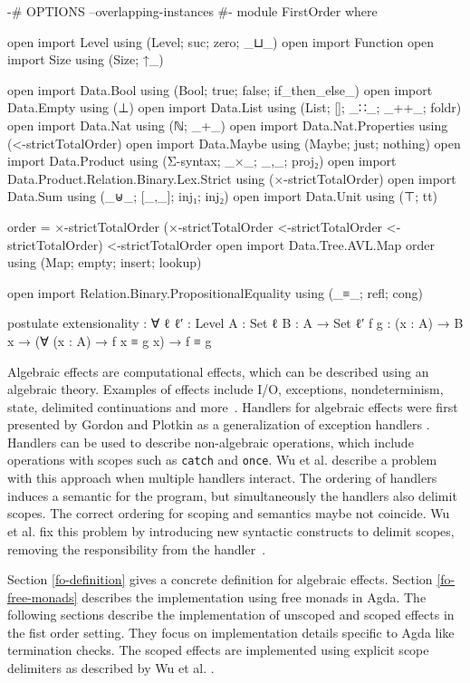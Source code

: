 \begin{code}[hide]
{-# OPTIONS --overlapping-instances #-}
module FirstOrder where

open import Level using (Level; suc; zero; _⊔_)
open import Function
open import Size using (Size; ↑_)

open import Data.Bool using (Bool; true; false; if_then_else_)
open import Data.Empty using (⊥)
open import Data.List using (List; []; _∷_; _++_; foldr)
open import Data.Nat using (ℕ; _+_)
open import Data.Nat.Properties using (<-strictTotalOrder)
open import Data.Maybe using (Maybe; just; nothing)
open import Data.Product using (Σ-syntax; _×_; _,_; proj₂)
open import Data.Product.Relation.Binary.Lex.Strict using (×-strictTotalOrder)
open import Data.Sum using (_⊎_; [_,_]; inj₁; inj₂)
open import Data.Unit using (⊤; tt)

order = ×-strictTotalOrder (×-strictTotalOrder <-strictTotalOrder <-strictTotalOrder) <-strictTotalOrder
open import Data.Tree.AVL.Map order using (Map; empty; insert; lookup)

open import Relation.Binary.PropositionalEquality using (_≡_; refl; cong)

postulate
  extensionality : ∀ {ℓ ℓ′ : Level} {A : Set ℓ} {B : A → Set ℓ′} {f g : (x : A) → B x}
      → (∀ (x : A) → f x ≡ g x) → f ≡ g
\end{code}


Algebraic effects are computational effects, which can be described using an
algebraic theory.
Examples of effects include I/O, exceptions, nondeterminism, state, delimited
continuations and more~\cite{DBLP:journals/corr/abs-1807-05923}.
Handlers for algebraic effects were first presented by Gordon and Plotkin
as a generalization of exception handlers \cite{}. %
Handlers can be used to describe non-algebraic operations, which include
operations with scopes such as \texttt{catch} and \texttt{once}.
Wu et al. describe a problem with this approach when multiple handlers
interact.
The ordering of handlers induces a semantic for the program, but simultaneously
the handlers also delimit scopes.
The correct ordering for scoping and semantics maybe not coincide.
Wu et al. fix this problem by introducing new syntactic constructs to delimit
scopes, removing the responsibility from the
handler~\cite{DBLP:conf/haskell/WuSH14,DBLP:conf/lics/PirogSWJ18}.

Section \ref{fo-definition} gives a concrete definition for algebraic effects.
Section \ref{fo-free-monads} describes the implementation using free monads in
Agda.
The following sections describe the implementation of unscoped and scoped
effects in the fist order setting. They focus on implementation details specific
to Agda like termination checks.
The scoped effects are implemented using explicit scope delimiters as described
by Wu et al. \cite{DBLP:conf/haskell/WuSH14}.

